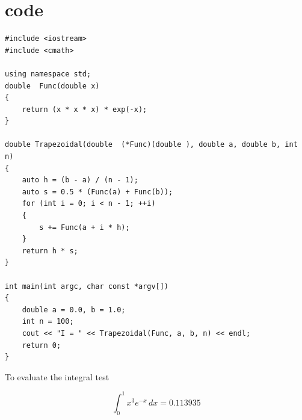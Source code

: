 \section{code}
\begin{verbatim}
#include <iostream>
#include <cmath>

using namespace std;
double  Func(double x)
{
    return (x * x * x) * exp(-x);
}

double Trapezoidal(double  (*Func)(double ), double a, double b, int n)
{
    auto h = (b - a) / (n - 1);
    auto s = 0.5 * (Func(a) + Func(b));
    for (int i = 0; i < n - 1; ++i)
    {
        s += Func(a + i * h);
    }
    return h * s;
}

int main(int argc, char const *argv[])
{
    double a = 0.0, b = 1.0;
    int n = 100;
    cout << "I = " << Trapezoidal(Func, a, b, n) << endl;
    return 0;
}
\end{verbatim}

To evaluate the integral test 

\begin{equation*}
    \int_0^1 x^3 e^{-x}\,dx = 0.113935
\end{equation*}

